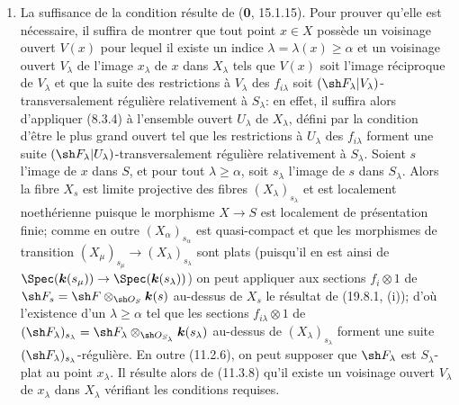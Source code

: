 \begin{enumerate}
  \item[(i)] La suffisance de la condition résulte de (\textbf{0}, 15.1.15). Pour prouver qu'elle est nécessaire, il suffira de montrer que tout point $x\in X$ possède un voisinage ouvert $V(x)$ pour lequel il existe un indice $\lambda=\lambda(x)\geq\alpha$ et un voisinage ouvert $V_\lambda$ de l'image $x_\lambda$ de $x$ dans $X_\lambda$ tels que $V(x)$ soit l'image réciproque de $V_\lambda$ et que la suite des restrictions à $V_\lambda$ des $f_{i\lambda}$ soit $(\sh F_\lambda|V_\lambda)$-transversalement régulière relativement à $S_\lambda$: en effet, il suffira alors d'appliquer (8.3.4) à l'ensemble ouvert $U_\lambda$ de $X_\lambda$, défini par la condition d'être le plus grand ouvert tel que les restrictions à $U_\lambda$ des $f_{i\lambda}$ forment une suite $(\sh F_\lambda|U_\lambda)$-transversalement régulière relativement à $S_\lambda$.
  Soient $s$ l'image de $x$ dans $S$, et pour tout $\lambda\geq\alpha$, soit $s_\lambda$ l'image de $s$ dans $S_\lambda$. Alors la fibre $X_s$ est limite projective des fibres $(X_\lambda)_{s_\lambda}$ et est localement noethérienne puisque le morphisme $X\to S$ est localement de présentation finie; comme en outre $(X_\alpha)_{s_\alpha}$ est quasi-compact et que les morphismes de transition $(X_\mu)_{s_\mu}\to(X_\lambda)_{s_\lambda}$ sont plats (puisqu'il en est ainsi de $\Spec(\boldsymbol{k}(s_\mu))\to\Spec(\boldsymbol{k}(s_\lambda))$) on peut appliquer aux sections $f_i\otimes1$ de $\sh F_s=\sh F\otimes_{\sh O_S}\boldsymbol{k}(s)$ au-dessus de $X_s$ le résultat de (19.8.1, (i)); d'où l'existence d'un $\lambda\geq\alpha$ tel que les sections $f_{i\lambda}\otimes1$ de $(\sh F_\lambda)_{s_\lambda}=\sh F_\lambda\otimes_{\sh O_{S_\lambda}}\boldsymbol{k}(s_\lambda)$ au-dessus de $(X_\lambda)_{s_\lambda}$ forment une suite $(\sh F_\lambda)_{s_\lambda}$-régulière. En outre (11.2.6), on peut supposer que $\sh F_\lambda$ est $S_\lambda$-plat au point $x_\lambda$. Il résulte alors de (11.3.8) qu'il existe un voisinage ouvert $V_\lambda$ de $x_\lambda$ dans $X_\lambda$ vérifiant les conditions requises.


\end{enumerate}

